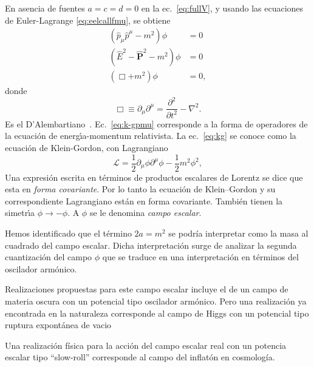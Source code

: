 En asencia de fuentes $a=c=d=0$ en la ec.~\eqref{eq:fullV}, y usando las
ecuaciones de Euler-Lagrange \eqref{eq:eelcallfmu}, se obtiene
\begin{align}
  (\hat{p}_\mu\hat{p}^\mu-m^2)\phi&=0\nonumber\\
  \label{eq:k-gpmu} %
(\hat{E}^2-\hat{\mathbf{P}}^2-m^2)\phi&=0\\
\label{eq:kg} 
  (\Box+m^2)\phi&=0,
\end{align}
donde
\begin{equation}
  \label{eq:dalambertiano}
  \Box\equiv\partial_\mu\partial^\mu=\frac{\partial^2}{\partial t^2}-\nabla^2. 
\end{equation}
Es el D'Alembartiano~\cite{daelembertiano}. 
Ec.~\eqref{eq:k-gpmu} %
corresponde a la forma de operadores de la
ecuaci\'on de energ\'\i a-momentum relativista. La
ec.~\eqref{eq:kg} se conoce como la ecuaci\'on de Klein-Gordon, con
Lagrangiano
\begin{equation}
  \label{eq:kglag}
  \mathcal{L}=\frac{1}{2}\partial_\mu\phi\partial^\mu\phi-\frac{1}{2}m^2\phi^2, 
\end{equation}
Una expresi\'on escrita en t\'erminos de productos escalares de
Lorentz se dice que esta en \emph{forma covariante}. Por lo tanto la
ecuaci\'on de Klein--Gordon y su correspondiente Lagrangiano est\'an
en forma covariante. Tambi\'en tienen la simetr\'\i a
$\phi\to-\phi$. A $\phi$ se le denomina \emph{campo escalar}.

Hemos identificado que el término $2a=m^2$ se podría interpretar como la masa al cuadrado del campo escalar. Dicha interpretación surge de analizar la segunda cuantización del campo $\phi$ que se traduce en una interpretación en términos del oscilador armónico.

Realizaciones propuestas para este campo escalar incluye el de un campo de materia oscura con un potencial tipo oscilador armónico.
Pero una realización ya encontrada en la naturaleza corresponde al campo de Higgs con un potencial tipo ruptura expontánea de vacio

Una realización física para la acción del campo escalar real con un potencia escalar tipo ``slow-roll''  corresponde al campo del inflatón en cosmología.




